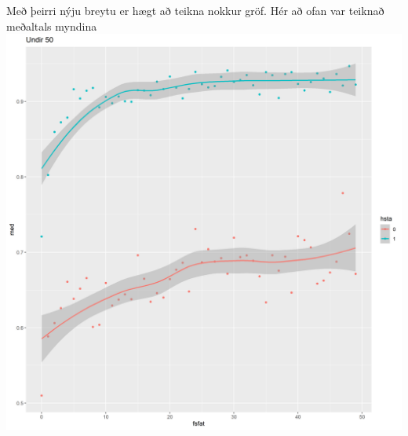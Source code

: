 \documentclass[
]{article}
\begin{document}
Með þeirri nýju breytu er hægt að teikna nokkur gröf. Hér að ofan var teiknað meðaltals myndina
\includegraphics{Imgsimplify/plotbymean50.png}
\end{document}
